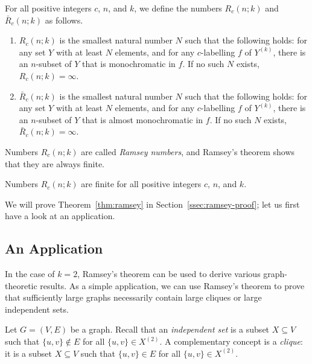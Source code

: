 For all positive integers $c$, $n$, and $k$, we define the numbers $R_c(n;k)$ and $\bar{R}_c(n;k)$ as follows.
\begin{enumerate}
    \item $R_c(n;k)$ is the smallest natural number $N$ such that the following holds: for any set $Y$ with at least $N$ elements, and for any $c$-labelling $f$ of $Y^{(k)}$, there is an $n$-subset of $Y$ that is monochromatic in $f$. If no such $N$ exists, $R_c(n;k) = \infty$.
    \item $\bar{R}_c(n;k)$ is the smallest natural number $N$ such that the following holds: for any set $Y$ with at least $N$ elements, and for any $c$-labelling $f$ of $Y^{(k)}$, there is an $n$-subset of $Y$ that is almost monochromatic in $f$. If no such $N$ exists, $\bar{R}_c(n;k) = \infty$.
\end{enumerate}
Numbers $R_c(n;k)$ are called \emph{Ramsey numbers}, and Ramsey's theorem shows that they are always finite.

\begin{theorem}\label{thm:ramsey}
    Numbers $R_c(n;k)$ are finite for all positive integers $c$, $n$, and $k$.
\end{theorem}

We will prove Theorem~\ref{thm:ramsey} in Section~\ref{ssec:ramsey-proof}; let us first have a look at an application.


\subsection{An Application}

In the case of $k = 2$, Ramsey's theorem can be used to derive various graph-theoretic results. As a simple application, we can use Ramsey's theorem to prove that sufficiently large graphs necessarily contain large cliques or large independent sets.

Let $G = (V,E)$ be a graph. Recall that an \emph{independent set} is a subset $X \subseteq V$ such that $\{u,v\} \notin E$ for all $\{u, v\} \in X^{(2)}$. A complementary concept is a \emph{clique}: it is a subset $X \subseteq V$ such that $\{u,v\} \in E$ for all $\{u, v\} \in X^{(2)}$.


